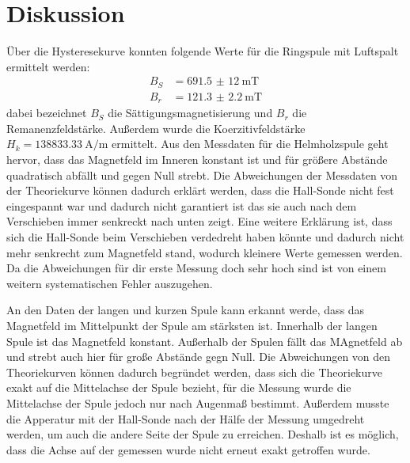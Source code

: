 \section{Diskussion}
Über die Hysteresekurve konnten folgende Werte für die
Ringspule mit Luftspalt ermittelt werden:
\begin{align*}
  B_{S} &=\SI{691,5(12)}{\milli\tesla} \\
  B_{r} &=\SI{121.3(22)}{\milli\tesla}
\end{align*}
\noindent dabei bezeichnet $B_{S}$ die Sättigungsmagnetisierung
und $B_{r}$ die Remanenzfeldstärke. Außerdem wurde die
Koerzitivfeldstärke $H_{k}=\SI{138833,33}{\ampere \per \meter}$
ermittelt.
Aus den Messdaten für die Helmholzspule geht hervor, dass
das Magnetfeld im Inneren konstant ist und für größere
Abstände quadratisch abfällt und gegen Null strebt.
Die Abweichungen der Messdaten von der Theoriekurve können
dadurch erklärt werden, dass die Hall-Sonde nicht
fest eingespannt war und dadurch nicht garantiert ist
das sie auch nach dem Verschieben immer senkreckt nach
unten zeigt. Eine weitere Erklärung ist, dass sich die
Hall-Sonde beim Verschieben verdedreht haben könnte
und dadurch nicht mehr senkrecht zum Magnetfeld stand, wodurch
kleinere Werte gemessen werden.
Da die Abweichungen für dir erste Messung doch sehr hoch sind
ist von einem weitern systematischen Fehler auszugehen.

An den Daten der langen und kurzen Spule  kann erkannt
werde, dass das Magnetfeld im Mittelpunkt der Spule am
stärksten ist. Innerhalb der langen Spule ist das
Magnetfeld konstant. Außerhalb der Spulen fällt das
MAgnetfeld ab und strebt auch hier für große
Abstände gegn Null.
Die Abweichungen von den Theoriekurven können dadurch begründet
werden, dass sich die Theoriekurve exakt auf die
Mittelachse der Spule bezieht, für die Messung wurde
die Mittelachse der Spule jedoch nur nach Augenmaß bestimmt.
Außerdem musste die Apperatur mit der Hall-Sonde nach der
Hälfe der Messung umgedreht werden, um auch die andere
Seite der Spule zu erreichen. Deshalb ist es möglich, dass
die Achse auf der gemessen wurde nicht erneut exakt
getroffen wurde.





\label{sec:Diskussion}
